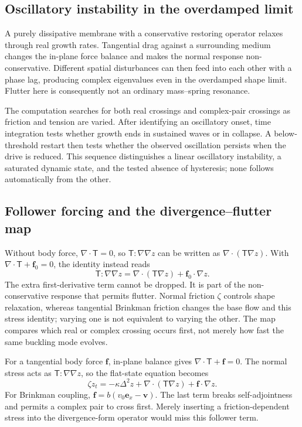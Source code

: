 \subsection{Oscillatory instability in the overdamped limit}
A purely dissipative membrane with a conservative restoring operator relaxes through real growth rates. Tangential drag against a surrounding medium changes the in-plane force balance and makes the normal response non-conservative. Different spatial disturbances can then feed into each other with a phase lag, producing complex eigenvalues even in the overdamped shape limit. Flutter here is consequently not an ordinary mass--spring resonance.

The computation searches for both real crossings and complex-pair crossings as friction and tension are varied. After identifying an oscillatory onset, time integration tests whether growth ends in sustained waves or in collapse. A below-threshold restart then tests whether the observed oscillation persists when the drive is reduced. This sequence distinguishes a linear oscillatory instability, a saturated dynamic state, and the tested absence of hysteresis; none follows automatically from the other.


\subsection{Follower forcing and the divergence--flutter map}


Without body force, $\nabla\cdot\mathsf T=0$, so $\mathsf T:\nabla\nabla z$ can be written as $\nabla\cdot(\mathsf T\nabla z)$. With $\nabla\cdot\mathsf T+\bm f_0=0$, the identity instead reads
\begin{equation}
\mathsf T:\nabla\nabla z=\nabla\cdot(\mathsf T\nabla z)+\bm f_0\cdot\nabla z.
\end{equation}
The extra first-derivative term cannot be dropped. It is part of the non-conservative response that permits flutter. Normal friction $\zeta$ controls shape relaxation, whereas tangential Brinkman friction changes the base flow and this stress identity; varying one is not equivalent to varying the other. The map compares which real or complex crossing occurs first, not merely how fast the same buckling mode evolves.


For a tangential body force $\bm f$, in-plane balance gives $\nabla\cdot\mathsf T+\bm f=0$. The normal stress acts as $\mathsf T:\nabla\nabla z$, so the flat-state equation becomes
\begin{equation}
\zeta z_t=-\kappa\Delta^2z+\nabla\cdot(\mathsf T\nabla z)+\bm f\cdot\nabla z.\label{eq:follower}
\end{equation}
For Brinkman coupling, $\bm f=b(v_0\bm e_x-\bm v)$. The last term breaks self-adjointness and permits a complex pair to cross first. Merely inserting a friction-dependent stress into the divergence-form operator would miss this follower term.

